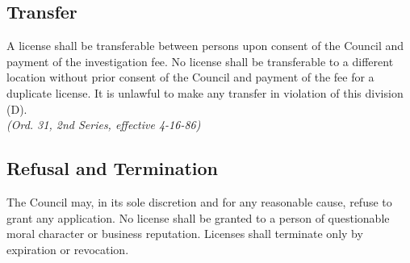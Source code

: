 \subsection{Transfer}
A license shall be transferable between persons upon consent of the Council and payment of the investigation fee.  No license shall be transferable to a different location without prior consent of the Council and payment of the fee for a duplicate license.  It is unlawful to make any transfer in violation of this division (D).\\
\emph{(Ord. 31, 2nd Series, effective 4-16-86)}
\subsection{Refusal and Termination}
The Council may, in its sole discretion and for any reasonable cause, refuse to grant any application.  No license shall be granted to a person of questionable moral character or business reputation.  Licenses shall terminate only by expiration or revocation.
